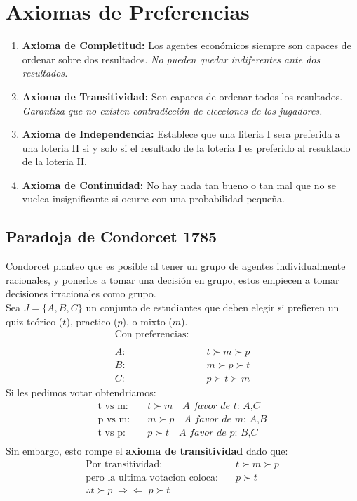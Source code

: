 \documentclass[12pt]{article}
\begin{document}
\section{Axiomas de Preferencias}
\begin{enumerate}
    \item \textbf{Axioma de Completitud:} Los agentes económicos siempre son capaces de ordenar sobre dos resultados. \textit{No pueden quedar indiferentes ante dos resultados.}
    \item \textbf{Axioma de Transitividad:} Son capaces de ordenar todos los resultados. \textit{Garantiza que no existen contradicción de elecciones de los jugadores.} 
    \item \textbf{Axioma de Independencia:} Establece que una literia I sera preferida a una loteria II si y solo si el resultado de la loteria I es preferido al resuktado de la loteria II. 
    \item \textbf{Axioma de Continuidad:} No hay nada tan bueno o tan mal que no se vuelca insignificante si ocurre con una probabilidad pequeña. 
\end{enumerate}
\subsection{Paradoja de Condorcet 1785}
Condorcet planteo que es posible al tener un grupo de agentes individualmente racionales, y ponerlos a tomar una decisión en grupo, estos empiecen a tomar decisiones irracionales como grupo. \\
Sea $J=\{A,B,C\}$ un conjunto de estudiantes que deben elegir si prefieren un quiz teórico ($t$), practico ($p$), o mixto ($m$). 
\begin{align*}
    \text{Con preferencias:}&\\\\
    A:& \quad t\succ m\succ p \\
    B: & \quad m \succ p \succ t \\
    C: & \quad p \succ t \succ m 
\end{align*}
Si les pedimos votar obtendriamos: 
\begin{align*}
    \text{t vs m:}& \quad t \succ m \quad \textit{A favor de t: A,C}\\
    \text{p vs m:}& \quad m \succ p \quad \textit{A favor de m: A,B}\\
    \text{t vs p:}& \quad p \succ t \quad \textit{A favor de p: B,C}\\
\end{align*}
Sin embargo, esto rompe el \textbf{axioma de transitividad} dado que:
\begin{align*}
   \text{Por transitividad:}& \quad  t \succ m \succ p  \\
   \text{pero la ultima votacion coloca:}&\quad  p \succ t \\
   \therefore t \succ p \;\mathbf{\Rightarrow \Leftarrow} \;p \succ t
\end{align*}
\end{document}
